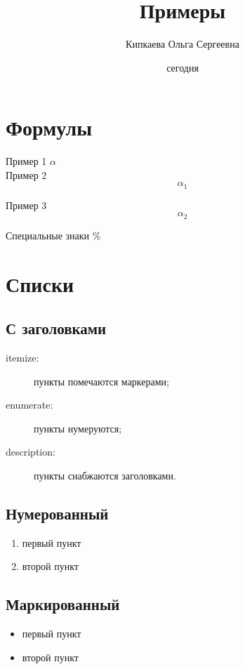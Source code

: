 \documentclass[12pt]{article}
\title{Примеры}
\author{Кипкаева Ольга Сергеевна}
\date{сегодня}
\begin{document}

\maketitle %

\section{Формулы} %

Пример 1 $\alpha$\\ %
Пример 2 $$\alpha_1$$ %

Пример 3 \[\alpha_2\] %

Специальные знаки $\%$\\

\section{Списки}
\subsection*{С заголовками} %
\begin{description}
\item[itemize:] пункты помечаются маркерами;
\item[enumerate:] пункты нумеруются;
\item[description:] пункты снабжаются заголовками.
\end{description}

\subsection{Нумерованный}
\begin{enumerate}
\item первый пункт
\item второй пункт
\end{enumerate}

\subsection{Маркированный}
\begin{itemize}
\item первый пункт
\item второй пункт
\end{itemize}
\end{document}
